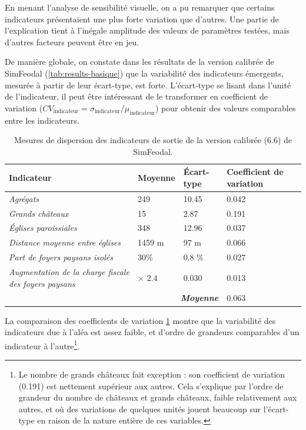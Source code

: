 En menant l'analyse de sensibilité visuelle, on a pu remarquer que certains indicateurs présentaient une plus forte variation que d'autres.
Une partie de l'explication tient à l'inégale amplitude des valeurs de paramètres testées, mais d'autres facteurs peuvent être en jeu.

De manière globale, on constate dans les résultats de la version calibrée de SimFeodal (\cref{tab:results-basique}) que la variabilité des indicateurs émergents, mesurée à partir de leur écart-type, est forte.
L'écart-type se lisant dans l'unité de l'indicateur, il peut être intéressant de le transformer en coefficient de variation ($CV_{\text{indicateur}} = \sigma_{\text{indicateur}}  /  \mu_{\text{indicateur}}$) pour obtenir des valeurs comparables entre les indicateurs. 


\begin{table}[H]
{\renewcommand{\arraystretch}{1.1}%
	\begin{tabular}{|p{5cm}|p{2.5cm}|p{2.5cm}|p{2.5cm}|}
\hline
\textbf{Indicateur} & \textbf{Moyenne} & \textbf{Écart-type} & \textbf{Coefficient de variation} \\
\hline
\textit{Agrégats} & 249 & 10.45 & 0.042\\
\hline
\textit{Grands châteaux} & 15 & 2.87 & 0.191\\
\hline
\textit{Églises paroissiales} & 348 & 12.96 & 0.037\\
\hline
\textit{Distance moyenne entre églises} & 1459 m & 97 m & 0.066\\
\hline
\textit{Part de foyers paysans isolés} & 30\% & 0.8 \% & 0.027\\
\hline
\textit{Augmentation de la charge fiscale des foyers paysans} & $\times$ 2.4 & 0.030 & 0.013\\
\hline
\multicolumn{3}{r|}{\textbf{\textit{Moyenne}}} & 0.063\\
\cline{4-4}
	\end{tabular}
}
\caption[Mesures de dispersion des indicateurs de sortie de SimFeodal.]{Mesures de dispersion des indicateurs de sortie de la version calibrée (6.6) de SimFeodal.}
\label{tab:variabilite-indicateurs}
\end{table}

La comparaison des coefficients de variation \cref{tab:variabilite-indicateurs} montre que la variabilité des indicateurs due à l'aléa est assez faible, et d'ordre de grandeurs comparables d'un indicateur à l'autre\footnote{
	Le nombre de grands châteaux fait exception : son coefficient de variation (0.191) est nettement supérieur aux autres.
	Cela s'explique par l'ordre de grandeur du nombre de châteaux et grands châteaux, faible relativement aux autres, et où des variations de quelques unités jouent beaucoup sur l'écart-type en raison de la nature entière de ces variables.
}.

